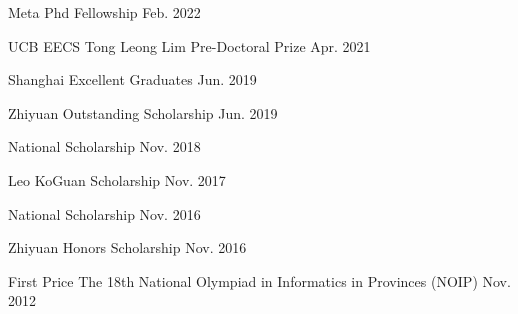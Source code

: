 
\begin{cvhonors}

\cvhonortop
{Meta Phd Fellowship} %
{} %
{} %
{Feb. 2022} %

\cvhonortop
{UCB EECS Tong Leong Lim Pre-Doctoral Prize} %
{} %
{} %
{Apr. 2021} %

\cvhonortop
{Shanghai Excellent Graduates} %
{} %
{} %
{Jun. 2019} %

\cvhonortop
{Zhiyuan Outstanding Scholarship} %
{} %
{} %
{Jun. 2019} %

\cvhonortop
{National Scholarship} %
{} %
{} %
{Nov. 2018} %

\cvhonortop
{Leo KoGuan Scholarship} %
{} %
{} %
{Nov. 2017} %


\cvhonortop
{National Scholarship } %
{} %
{} %
{Nov. 2016} %

\cvhonortop
{Zhiyuan Honors Scholarship} %
{} %
{} %
{Nov. 2016} %

\cvhonor
{First Price} %
{The 18th National Olympiad in Informatics in Provinces (NOIP)} %
{} %
{Nov. 2012} %

\end{cvhonors}